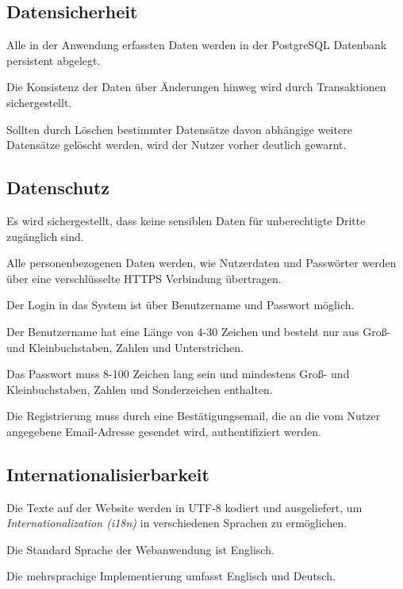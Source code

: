 \subsection{Datensicherheit}

\begin{description}
	 Alle in der Anwendung erfassten Daten werden in der PostgreSQL Datenbank persistent abgelegt.

	 Die Konsistenz der Daten über Änderungen hinweg wird durch Transaktionen sichergestellt.

	 Sollten durch Löschen bestimmter Datensätze davon abhängige weitere Datensätze gelöscht werden, wird der Nutzer vorher deutlich gewarnt.
\end{description}

\subsection{Datenschutz}

\begin{description}
	 Es wird sichergestellt, dass keine sensiblen Daten für unberechtigte Dritte zugänglich sind.

	 Alle personenbezogenen Daten werden, wie Nutzerdaten und Passwörter werden über eine verschlüsselte HTTPS Verbindung übertragen.

	 Der Login in das System ist über Benutzername und Passwort möglich.

	 Der Benutzername hat eine Länge von 4-30 Zeichen und besteht nur aus Groß- und Kleinbuchstaben, Zahlen und Unterstrichen.

	 Das Passwort muss 8-100 Zeichen lang sein und mindestens Groß- und Kleinbuchstaben, Zahlen und Sonderzeichen enthalten.

	 Die Registrierung muss durch eine Bestätigungsemail, die an die vom Nutzer angegebene Email-Adresse gesendet wird, authentifiziert werden.
\end{description}

\subsection{Internationalisierbarkeit}

\begin{description}
	 Die Texte auf der Website werden in UTF-8 kodiert
	und ausgeliefert, um \textit{Internationalization (i18n)} in verschiedenen Sprachen zu ermöglichen.

	 Die Standard Sprache der Webanwendung ist Englisch.

	 Die mehrsprachige Implementierung umfasst Englisch und Deutsch.
 \end{description}

